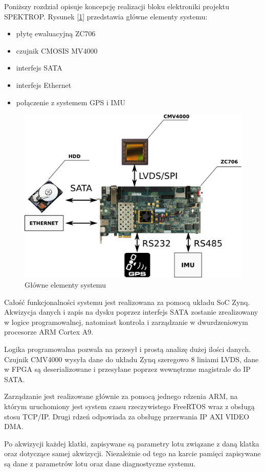 \documentclass[a4paper,11pt,oneside]{report}  %
\begin{document}
Poniższy rozdział opisuje koncepcję realizacji bloku elektroniki projektu SPEKTROP. Rysunek [\ref{fig:OVER}] przedstawia główne elementy systemu: 
\begin{itemize}
	\item płytę ewaluacyjną ZC706
	\item czujnik CMOSIS MV4000
	\item interfejs SATA
	\item interfejs Ethernet
	\item połączenie z systemem GPS i IMU
\end{itemize}
\begin{figure}[!h]
	\centering
	\includegraphics[width=12cm]{OVER2.png}
	\caption{Główne elementy systemu}
	\label{fig:OVER}
\end{figure}

Całość funkcjonalności systemu jest realizowana za pomocą układu SoC Zynq. Akwizycja danych i zapis na dysku poprzez interfejs SATA zostanie zrealizowany w logice programowalnej, natomiast kontrola i zarządzanie w dwurdzeniowym procesorze ARM Cortex A9. 

Logika programowalna pozwala na przesył i prostą analizę dużej ilości danych. Czujnik CMV4000 wysyła dane do układu Zynq szeregowo 8 liniami LVDS, dane w FPGA są deserializowane i przesyłane poprzez wewnętrzne magistrale do IP SATA. 


Zarządzanie jest realizowane głównie za pomocą jednego rdzenia ARM, na którym uruchomiony jest system czasu rzeczywistego FreeRTOS wraz z obsługą stosu TCP/IP. Drugi rdzeń odpowiada za obsługę przerwania IP AXI VIDEO DMA.

Po akwizycji każdej klatki, zapisywane są parametry lotu związane z daną klatka oraz dotyczące samej akwizycji. Niezależnie od tego na karcie pamięci zapisywane są dane z parametrów lotu oraz dane diagnostyczne systemu. 
\end{document}
